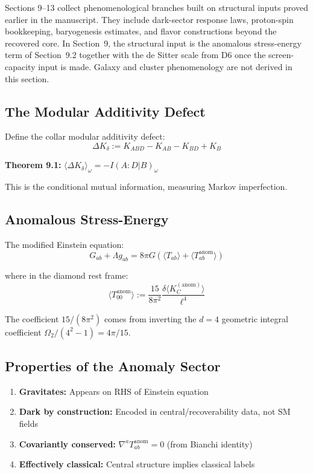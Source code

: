 Sections 9--13 collect phenomenological branches built on structural inputs proved earlier in the manuscript. They include dark-sector response laws, proton-spin bookkeeping, baryogenesis estimates, and flavor constructions beyond the recovered core. In Section~9, the structural input is the anomalous stress-energy term of Section~9.2 together with the de Sitter scale from D6 once the screen-capacity input is made. Galaxy and cluster phenomenology are not derived in this section.

\subsection{The Modular Additivity Defect}\label{91-the-modular-additivity-defect}

Define the collar modular additivity defect: \[\Delta K_\delta := K_{ABD} - K_{AB} - K_{BD} + K_B\]

\textbf{Theorem 9.1:} \(\langle \Delta K_\delta \rangle_\omega = -I(A:D|B)_\omega\)

This is the conditional mutual information, measuring Markov imperfection.

\subsection{Anomalous Stress-Energy}\label{92-anomalous-stress-energy}

The modified Einstein equation: \[G_{ab} + \Lambda g_{ab} = 8\pi G \left(\langle T_{ab} \rangle + \langle T_{ab}^{\text{anom}} \rangle\right)\]

where in the diamond rest frame: \[\langle T_{00}^{\text{anom}} \rangle := \frac{15}{8\pi^2} \frac{\delta\langle K_C^{(\text{anom})} \rangle}{\ell^4}\]

The coefficient \(15/(8\pi^2)\) comes from inverting the \(d=4\) geometric integral coefficient \(\Omega_2/(4^2-1) = 4\pi/15\).

\subsection{Properties of the Anomaly Sector}\label{93-properties-of-the-anomaly-sector}

\begin{enumerate}
\def\labelenumi{\arabic{enumi}.}
\tightlist
\item
 \textbf{Gravitates:} Appears on RHS of Einstein equation
\item
 \textbf{Dark by construction:} Encoded in central/recoverability data, not SM fields
\item
 \textbf{Covariantly conserved:} \(\nabla^a T_{ab}^{\text{anom}} = 0\) (from Bianchi identity)
\item
 \textbf{Effectively classical:} Central structure implies classical labels
\end{enumerate}

